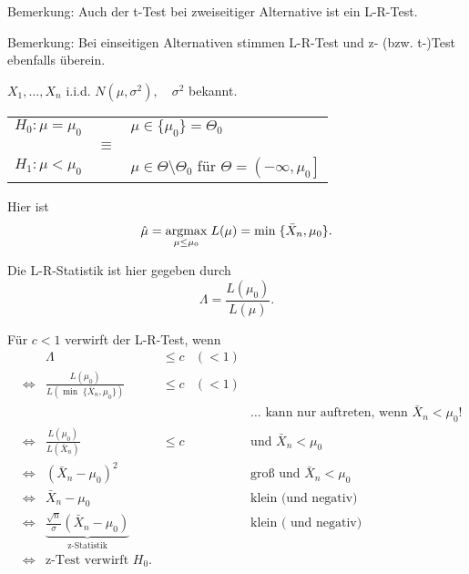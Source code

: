\documentclass{tstextbook}
\begin{document}
\begin{remark}
	Bemerkung: Auch der t-Test bei zweiseitiger Alternative ist ein L-R-Test.
\end{remark}

\begin{remark}
	Bemerkung: Bei einseitigen Alternativen stimmen L-R-Test und z- (bzw. t-)Test ebenfalls überein. 
\end{remark}

\begin{example}
	$ X_1,\ldots,X_n $ i.i.d. $ N(\mu,\sigma^2), \quad \sigma^2 $ bekannt. 
	
	\begin{center}
	\begin{tabular}{lcl}
		$ H_0 \colon \mu=\mu_0 $ & & $ \mu\in\{\mu_0\}=\Theta_0 $ \\
			& $\equiv$ & \\
		$ H_1 \colon \mu < \mu_0 $ & & $ \mu\in\Theta\setminus\Theta_0 $ für $ \Theta=\left(-\infty,\mu_0\right] $
	\end{tabular}
	\end{center}

	Hier ist \[ \hat{\mu} = \underset{\mu\le\mu_0}{\operatorname{argmax}}\; L(\mu) = \min \; \{\bar{X}_n,\mu_0\}. \]
	
	Die L-R-Statistik ist hier gegeben durch 
	\[
	\Lambda = \frac{L(\mu_0)}{L(\hat{\mu})}.
	\]
	
	Für $ c<1 $ verwirft der L-R-Test, wenn 
	\[
	\begin{aligned}
	&& \Lambda & \le c & (<1) &	\\
	& \Leftrightarrow & \frac{L(\mu_0)}{L(\min \; \{\bar{X}_n,\mu_0\})} & \le c & (<1) &\\
	& & & & & \ldots \text{ kann nur auftreten, wenn }\bar{X}_n < \mu_0! \\
	& \Leftrightarrow & \frac{L(\mu_0)}{L(\bar{X}_n)} & \le c &  &\text{und } \bar{X}_n < \mu_0 \\
	& \Leftrightarrow & (\bar{X}_n-\mu_0)^2 & & & \text{groß und } \bar{X}_n < \mu_0 \\
	& \Leftrightarrow & \bar{X}_n -\mu_0  & & & \text{klein (und negativ)} \\
	& \Leftrightarrow & \underbrace{\frac{\sqrt{n}}{\sigma}(\bar{X}_n-\mu_0)}_{\text{z-Statistik}} & & & \text{klein ( und negativ)} \\
	& \Leftrightarrow & \text{z-Test verwirft } H_0 .
	\end{aligned}
	\] 
\end{example}
\end{document}
